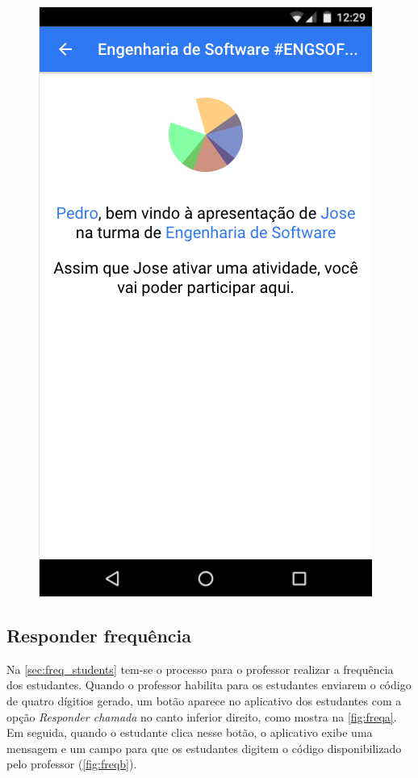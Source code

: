 \begin{figure}[ht]
{    \includegraphics[scale=.4]{imagens/telas/app_ask_success}
    \label{fig:app_ask_b}
  }

  \doautor
  \label{fig:app_ask_id}
\end{figure}

\subsection{Responder frequência}

Na \autoref{sec:freq_students} tem-se o processo para o professor realizar
a frequência dos estudantes. Quando o professor habilita para os
estudantes enviarem o código de quatro dígitios gerado, um botão aparece
no aplicativo dos estudantes com a opção \textit{Responder chamada} no canto inferior
direito, como mostra na \autoref{fig:freqa}. Em seguida, quando o estudante
clica nesse botão, o aplicativo exibe uma mensagem e um campo para que os
estudantes digitem o código disponibilizado pelo professor (\autoref{fig:freqb}).

